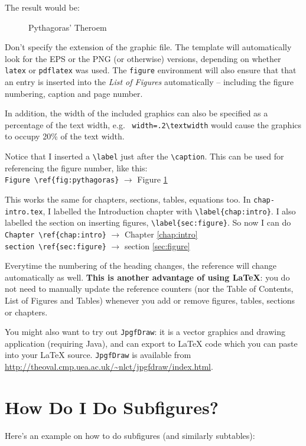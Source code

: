 The result would be:

\begin{figure}[hbt!]\centering
  \caption{Pythagoras' Theroem} \label{fig:pythagoras}
\end{figure}

Don't specify the extension of the graphic file.  The template will automatically look for the EPS or the PNG (or otherwise) versions, depending on whether \verb|latex| or \verb|pdflatex| was used.  The \texttt{figure} environment will also ensure that that an entry is inserted into the \emph{List of Figures} automatically -- including the figure numbering, caption and page number.

In addition, the width of the included graphics can also be specified as a percentage of the text width, e.g.~ \verb|width=.2\textwidth| would cause the graphics to occupy 20\% of the text width.

Notice that I inserted a \verb|\label| just after the \verb|\caption|.  This can be used for referencing the figure number, like this: \\
\verb|Figure \ref{fig:pythagoras}| $\to$ Figure \ref{fig:pythagoras}

This works the same for chapters, sections, tables, equations too.  In \verb|chap-intro.tex|, I labelled the Introduction chapter with \verb|\label{chap:intro}|.  I also labelled the section on inserting figures, \verb|\label{sec:figure}|.  So now I can do \\
\verb|Chapter \ref{chap:intro}| $\to$  Chapter \ref{chap:intro} \\
\verb|section \ref{sec:figure}| $\to$  section \ref{sec:figure}

Everytime the numbering of the heading changes, the reference will change automatically as well.  \textbf{This is another advantage of using \LaTeX{}}: you do not need to manually update the reference counters (nor the Table of Contents, List of Figures and Tables) whenever you add or remove figures, tables, sections or chapters.

You might also want to try out \texttt{JpgfDraw}: it is a vector graphics and drawing application (requiring Java), and can export to \LaTeX{} code which you can paste into your \LaTeX{} source. \texttt{JpgfDraw} is available from \url{http://theoval.cmp.uea.ac.uk/~nlct/jpgfdraw/index.html}.

\section{How Do I Do Subfigures?}
Here's an example on how to do subfigures (and similarly subtables):


